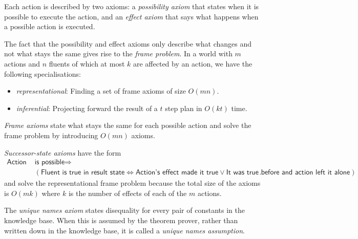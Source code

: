 \documentclass{article}
\begin{document}
\begin{definition}
	Each action is described by two axioms: a \emph{possibility axiom}
	that states when it is possible to execute the action, and an
	\emph{effect axiom} that says what happens when a possible action
	is executed.
\end{definition}

\begin{definition}
	The fact that the possibility and effect axioms only describe what changes
	and not what stays the same gives rise to the \emph{frame problem}. In a world
	with $m$ actions and $n$ fluents of which at most $k$ are affected by an action,
	we have the following specialisations:
	\begin{itemize}
		\item \emph{representational}: Finding a set of frame axioms of size $O(mn)$.
		\item \emph{inferential}: Projecting forward the result of a $t$ step plan in $O(kt)$ time.
	\end{itemize}
\end{definition}

\begin{theorem}
	\emph{Frame axioms} state what stays the same for each possible action and
	solve the frame problem by introducing $O(mn)$ axioms.
\end{theorem}

\begin{theorem}[R\&N p. 267]
	\emph{Successor-state axioms} have the form
	\begin{align*}
		\textsf{Action } & \textsf{is possible} \Rightarrow                         \\
		                 & (\textsf{Fluent is true in result state} \Leftrightarrow
		\textsf{Action's effect made it true}\vee \textsf{It was true before
			and action left it alone}).
	\end{align*}
	and solve the representational
	frame problem because the total size of the axioms is $O(mk)$ where
	$k$ is the number of effects of each of the $m$ actions.
\end{theorem}

\begin{definition}
	The \emph{unique names axiom} states disequality for every pair of
	constants in the knowledge base. When this is assumed by the theorem
	prover, rather than written down in the knowledge base, it is called
	a \emph{unique names assumption}.
\end{definition}
\end{document}
